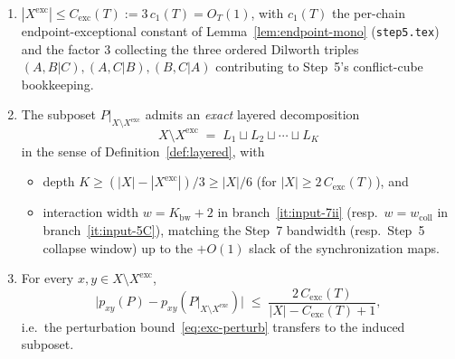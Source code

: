 \begin{lemma}
\begin{enumerate}[nosep, label=(\roman*)]
 \item\label{it:lift-size}
  $|X^{\mathrm{exc}}| \le C_{\mathrm{exc}}(T) := 3\,c_1(T) = O_T(1)$,
  with $c_1(T)$ the per-chain endpoint-exceptional constant of
  Lemma~\ref{lem:endpoint-mono} (\texttt{step5.tex}) and the factor
  $3$ collecting the three ordered Dilworth triples
  $(A,B|C), (A,C|B), (B,C|A)$ contributing to Step~5's
  conflict-cube bookkeeping.
 \item\label{it:lift-layered}
  The subposet $P|_{X \setminus X^{\mathrm{exc}}}$ admits an
  \emph{exact} layered decomposition
  \[
    X \setminus X^{\mathrm{exc}}
    \;=\; L_1 \sqcup L_2 \sqcup \cdots \sqcup L_K
  \]
  in the sense of Definition~\ref{def:layered}, with
  \begin{itemize}[nosep]
   \item depth $K \ge (|X| - |X^{\mathrm{exc}}|)/3 \ge |X|/6$
    (for $|X| \ge 2\,C_{\mathrm{exc}}(T)$), and
   \item interaction width
    $w = K_{\mathrm{bw}} + 2$ in branch~\ref{it:input-7ii}
    (resp.\ $w = w_{\mathrm{coll}}$ in branch~\ref{it:input-5C}),
    matching the Step~7 bandwidth (resp.\ Step~5 collapse window) up
    to the $+O(1)$ slack of the synchronization maps.
  \end{itemize}
 \item\label{it:lift-perturb}
  For every $x, y \in X \setminus X^{\mathrm{exc}}$,
  \[
    \big|p_{xy}(P) - p_{xy}(P|_{X \setminus X^{\mathrm{exc}}})\big|
    \;\le\; \frac{2\,C_{\mathrm{exc}}(T)}{|X| - C_{\mathrm{exc}}(T) + 1},
  \]
  i.e.\ the perturbation bound~\eqref{eq:exc-perturb} transfers to the
  induced subposet.
\end{enumerate}
\end{lemma}

